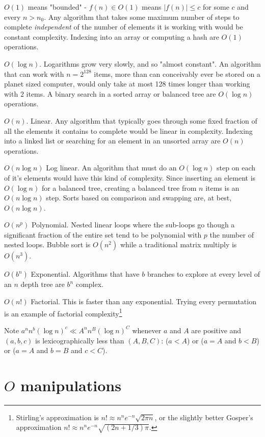 \documentclass{tufte-handout}
\theoremstyle{definition}
\theoremstyle{example}
\theoremstyle{theorem}
\begin{document}
$O(1)$ means "bounded" - $f(n) \in O(1)$ means $|f(n)| \leq c$ for some $c$ and every $n > n_0$.  Any algorithm that takes some maximum number of steps to complete {\em independent} of the number of elements it is working with would be constant complexity.  Indexing into an array or computing a hash are $O(1)$ operations.

$O(\log n)$.  Logarithms grow very slowly, and so "almost constant".  An algorithm that can work with $n=2^{128}$ items, more than can conceivably ever be stored on a planet sized computer, would only take at most 128 times longer than working with $2$ items.  A binary search in a sorted array or balanced tree are $O(\log n)$ operations.

$O(n)$. Linear.  Any algorithm that typically goes through some fixed fraction of all the elements it contains to complete would be linear in complexity. Indexing into a linked list or searching for an element in an unsorted array are $O(n)$ operations.

$O(n \log n)$ Log linear.  An algorithm that must do an $O(\log n)$ step on each of it's elements would have this kind of complexity.  Since inserting an element is $O(\log n)$ for a balanced tree, creating a balanced tree from $n$ items is an $O(n \log n)$ step.  Sorts based on comparison and swapping are, at best, $O(n \log n)$.

$O(n^p)$  Polynomial.  Nested linear loops where the sub-loops go though a significant fraction of the entire set tend to be polynomial with $p$ the number of nested loops.  Bubble sort is $O(n^2)$ while a traditional matrix multiply is $O(n^3)$.  

$O(b^n)$ Exponential.  Algorithms that have $b$ branches to explore at every level of an $n$ depth tree are $b^n$ complex.

$O(n!)$ Factorial.  This is faster than any exponential.  Trying every permutation is an example of factorial complexity\footnote{Stirling's approximation is $n! \approx n^n e^{-n} \sqrt{2\pi n}$, or the slightly better Gosper's approximation $n! \approx n^n e^{-n} \sqrt{(2n+1/3)\pi}$.}

Note $a^n n^b (\log n)^c \ll A^n n^B (\log n)^C$ whenever $a$ and $A$ are positive and $(a,b,c)$ is lexicographically less than $(A,B,C)$: ($a < A$) or ($a = A$ and $b < B$) or ($a=A$ and $b=B$ and $c < C$).

\section{$O$ manipulations}
\end{document}
